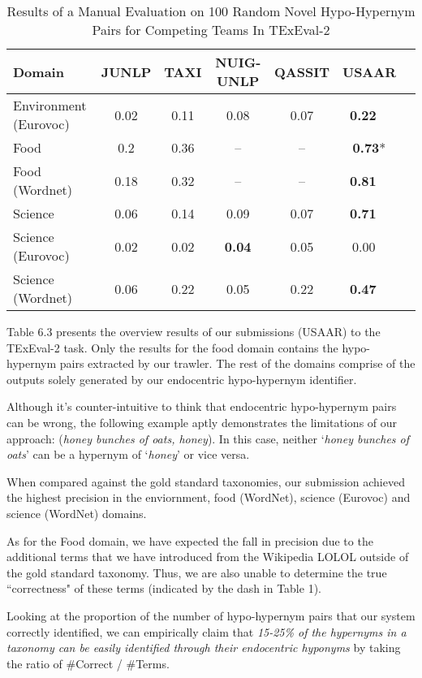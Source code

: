 \begin{table}[H]
\centering
    \begin{tabular}{l|cccc|cc}
    \textbf{Domain}                & \textbf{JUNLP} & \textbf{TAXI} & \textbf{NUIG-UNLP}  & \textbf{QASSIT} & \textbf{USAAR} \\ \hline
    Environment (Eurovoc) 	& 0.02  & 0.11 & 0.08      & 0.07   & \textbf{0.22 \ }   \\
    Food              		& 0.2   & 0.36  & --       & --  & \textbf{0.73}*      \\
    Food (Wordnet)    		& 0.18  & 0.32  & --      & --  & \textbf{0.81 \ }      \\
    Science           & 0.06        & 0.14  & 0.09       & 0.07  & \textbf{0.71 \ }      \\
    Science (Eurovoc) & 0.02        & 0.02  & \textbf{0.04}       & 0.05  & 0.00 \     \\
    Science (Wordnet) & 0.06        & 0.22  & 0.05       & 0.22  & \textbf{0.47 \ }      \\
    \end{tabular}
\caption{Results of a Manual Evaluation on 100 Random Novel Hypo-Hypernym Pairs for Competing Teams In TExEval-2 }
\end{table}


Table 6.3 presents the overview results of our submissions (USAAR) to the TExEval-2 task. Only the results for the food domain contains the hypo-hypernym pairs extracted by our trawler. The rest of the domains comprise of the outputs solely generated by our endocentric hypo-hypernym identifier. 

Although it's counter-intuitive to think that endocentric hypo-hypernym pairs can be wrong, the following example aptly demonstrates the limitations of our approach: (\emph{honey bunches of oats, honey}). In this case, neither `\emph{honey bunches of oats}' can be a hypernym of `\emph{honey}' or vice versa.

When compared against the gold standard taxonomies, our submission achieved the highest precision in the enviornment, food (WordNet), science (Eurovoc) and science (WordNet) domains. 

As for the Food domain, we have expected the fall in precision due to the additional terms that we have introduced from the Wikipedia LOLOL outside of the gold standard taxonomy. Thus, we are also unable to determine the true ``correctness" of these terms (indicated by the dash in Table 1). 

Looking at the proportion of the number of hypo-hypernym pairs that our system correctly identified, we can empirically claim that \emph{15-25\% of the hypernyms in a taxonomy can be easily identified through their endocentric hyponyms} by taking the ratio of \#Correct / \#Terms. 

